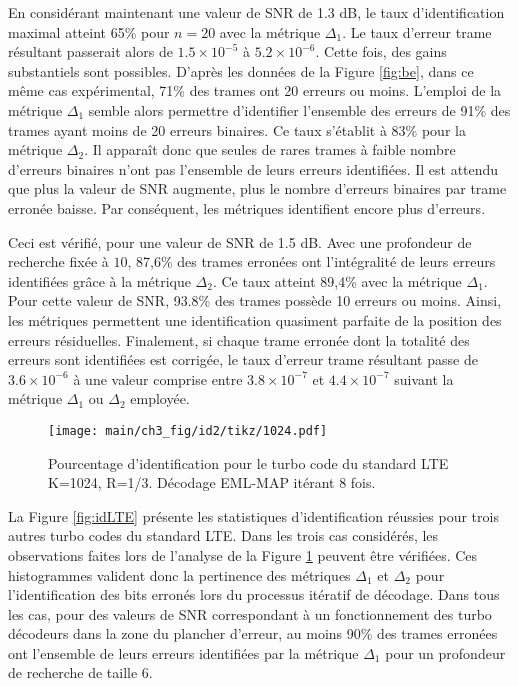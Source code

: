 En considérant maintenant une valeur de SNR de 1.3 dB, le taux d'identification maximal atteint 65\% pour $n=20$ avec la 
métrique $\Delta_1$. Le taux d'erreur trame résultant passerait alors de 
$1.5\times 10^{-5}$ à $5.2\times 10^{-6}$. Cette fois, des gains substantiels sont possibles. D'après les données de la 
Figure \ref{fig:be}, dans ce même cas expérimental, 71\% des trames ont 20 erreurs ou moins. 
L'emploi de la métrique $\Delta_1$ semble alors permettre d'identifier l'ensemble des erreurs de 91\% des trames ayant 
moins de 20 erreurs binaires. Ce taux s'établit à 83\% pour la métrique $\Delta_2$. 
Il apparaît donc que seules de rares trames à faible nombre d'erreurs binaires n'ont pas l'ensemble de leurs erreurs
identifiées. Il est attendu que plus la valeur de SNR augmente, plus le nombre d'erreurs binaires par trame erronée 
baisse. Par conséquent, les métriques identifient encore plus d'erreurs.

Ceci est vérifié, pour une valeur de SNR de 1.5 dB. Avec une profondeur de recherche fixée à $10$, 87,6\% des 
trames erronées ont l'intégralité de leurs erreurs identifiées grâce à la métrique $\Delta_2$. Ce taux atteint 89,4\% avec 
la métrique $\Delta_1$. Pour cette valeur de SNR, 93.8\% des trames possède 10 erreurs ou moins. Ainsi, les métriques 
permettent une identification quasiment parfaite de la position des erreurs résiduelles. Finalement, si chaque trame 
erronée dont la totalité des erreurs sont identifiées est corrigée, le taux d'erreur trame résultant passe de 
$3.6\times 10^{-6}$ à une valeur comprise entre $3.8\times 10^{-7}$ et $4.4\times 10^{-7}$ suivant la métrique $\Delta_1$ 
ou $\Delta_2$ employée.

\begin{figure}[!htb]
	\centering
	\texttt{[image: main/ch3\_fig/id2/tikz/1024.pdf]}
	\caption{Pourcentage d'identification pour le turbo code du standard LTE K=1024, R=1/3.
	Décodage EML-MAP itérant 8 fois. \label{fig:id1024}}
\end{figure}
La Figure \ref{fig:idLTE} présente les statistiques d'identification réussies pour trois autres turbo codes du standard 
LTE. Dans les trois cas considérés, les observations faites lors de l'analyse de la Figure \ref{fig:id1024} peuvent être 
vérifiées. Ces histogrammes valident donc la pertinence des métriques $\Delta_1$ et $\Delta_2$ pour l'identification des bits 
erronés lors du processus itératif de décodage. Dans tous les cas, pour des valeurs de SNR correspondant à un fonctionnement des 
turbo décodeurs dans la zone du plancher d'erreur, au moins 90\% des trames erronées ont l'ensemble de leurs erreurs 
identifiées par la métrique $\Delta_1$ pour un profondeur de recherche de taille 6.

